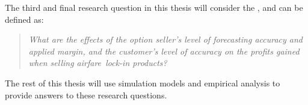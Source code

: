 \noindent
The third and final research question in this thesis will consider the , and can be defined as:

\begin{quote}\emph{What are the effects of the option seller's level of forecasting accuracy and applied margin, and the customer's level of accuracy on the profits gained when selling airfare~lock-in products?}\end{quote}

The rest of this thesis will use simulation models and empirical analysis to provide answers to these research questions.